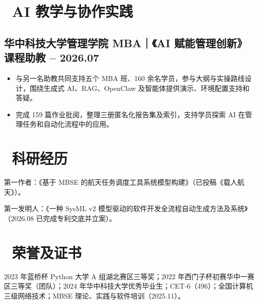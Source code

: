 \documentclass[10pt]{article}
\newcommand{\datedsubsection}[2]{\subsection{#1 \hfill \normalfont #2}}
\begin{document}
\section{\faUsers\ AI 教学与协作实践}
\datedsubsection{华中科技大学管理学院 MBA｜《AI 赋能管理创新》课程助教}{2025.03 -- 2026.07}
\begin{itemize}
  \item 与另一名助教共同支持五个 MBA 班、160 余名学员，参与大纲与实操路线设计，围绕生成式 AI、RAG、OpenClaw 及智能体提供演示、环境配置支持和答疑。
  \item 完成 159 篇作业批阅，整理三册匿名化报告集及索引，支持学员探索 AI 在管理任务和自动化流程中的应用。
\end{itemize}

\section{\faFlask\ 科研经历}
第一作者：《基于 MBSE 的航天任务调度工具系统模型构建》（已投稿《载人航天》）。

第一发明人：《一种 SysML v2 模型驱动的软件开发全流程自动生成方法及系统》（2026.08 已完成专利交底并立案）。

\section{\faTrophy\ 荣誉及证书}
2023 年蓝桥杯 Python 大学 A 组湖北赛区三等奖；2022 年西门子杯初赛华中一赛区三等奖（团队）；2024 年华中科技大学优秀毕业生；CET-6（496）；全国计算机三级网络技术；MBSE 理论、实践与软件培训（2025.11）。
\end{document}
